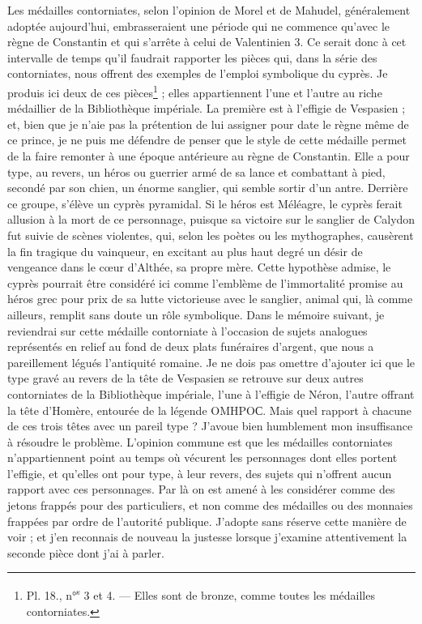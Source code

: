 \documentclass{article}
\begin{document}
Les médailles contorniates, selon l'opinion de Morel et de Mahudel, généralement adoptée aujourd'hui, embrasseraient une période qui ne commence qu'avec le règne de Constantin et qui s'arrête à celui de Valentinien 3. Ce serait donc à cet intervalle de temps qu'il faudrait rapporter les pièces qui, dans la série des contorniates, nous offrent des exemples de l'emploi symbolique du cyprès. Je produis ici deux de ces pièces\footnote{Pl. 18., n°\textsuperscript{s} 3 et 4. --- Elles sont de bronze, comme toutes les médailles contorniates.} ; elles appartiennent l'une et l'autre au riche médaillier de la Bibliothèque impériale. La première est à l'effigie de Vespasien ; et, bien que je n'aie pas la prétention de lui assigner pour date le règne même de ce prince, je ne puis me défendre de penser que le style de cette médaille permet de la faire remonter à une époque antérieure au règne de Constantin. Elle a pour type, au revers, un héros ou guerrier armé de sa lance et combattant à pied, secondé par son chien, un énorme sanglier, qui semble sortir d'un antre. Derrière ce groupe, s'élève un cyprès pyramidal. Si le héros est Méléagre, le cyprès ferait allusion à la mort de ce personnage, puisque sa victoire sur le sanglier de Calydon fut suivie de scènes violentes, qui, selon les poètes ou les mythographes, causèrent la fin tragique du vainqueur, en excitant au plus haut degré un désir de vengeance dans le cœur d'Althée, sa propre mère. Cette hypothèse admise, le cyprès pourrait être considéré ici comme l'emblème de l'immortalité promise au héros grec pour prix de sa lutte victorieuse avec le sanglier, animal qui, là comme ailleurs, remplit sans doute un rôle symbolique. Dans le mémoire suivant, je reviendrai sur cette médaille contorniate à l'occasion de sujets analogues représentés en relief au fond de deux plats funéraires d'argent, que nous a pareillement légués l'antiquité romaine. Je ne dois pas omettre d'ajouter ici que le type gravé au revers de la tête de Vespasien se retrouve sur deux autres contorniates de la Bibliothèque impériale, l'une à l'effigie de Néron, l'autre offrant la tête d'Homère, entourée de la légende \textgreek{ΟΜΗΡΟϹ}. Mais quel rapport à chacune de ces trois têtes avec un pareil type ? J'avoue bien humblement mon insuffisance à résoudre le problème. L'opinion commune est que les médailles contorniates n'appartiennent point au temps où vécurent les personnages dont elles portent l'effigie, et qu'elles ont pour type, à leur revers, des sujets qui n'offrent aucun rapport avec ces personnages. Par là on est amené à les considérer comme des jetons frappés pour des particuliers, et non comme des médailles ou des monnaies frappées par ordre de l'autorité publique. J'adopte sans réserve cette manière de voir ; et j'en reconnais de nouveau la justesse lorsque j'examine attentivement la seconde pièce dont j'ai à parler.
\end{document}
